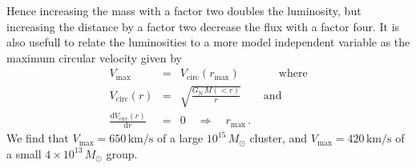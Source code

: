 \documentclass[10pt,aps,pra,reprint,amsmath,amsfonts,amssymb,showpacs]{revtex4-1}
\def\del#1{{}}
\newcommand{\rmn}{\mathrm}
\newcommand{\sub}{\rmn{sub}}
\newcommand{\msun}{M_\odot}
\newcommand{\dd}{\rmn{d}}
\begin{document}
Hence increasing the mass with a factor two doubles the luminosity,
but increasing the distance by a factor two decrease the flux with a
factor four. It is also usefull to relate the luminosities to a more
model independent variable as the maximum circular velocity given by
\begin{eqnarray}
V_\rmn{max} &=& V_\rmn{circ}(r_\rmn{max})\qquad\,\,\,\,\,\,\,\,\,\rmn{where}\nonumber\\
V_\rmn{circ}(r)&=& \sqrt{\frac{G_\rmn{N}\,M(<r)}{r}}\qquad\rmn{and}\nonumber\\
\frac{\dd V_\rmn{circ}(r)}{\dd r} &=& 0\quad \Longrightarrow\quad r_\rmn{max}\,.
\end{eqnarray}
We find that $V_\rmn{max}=650\,\rmn{km/s}$ of a large $10^{15}\,\msun$
cluster, and $V_\rmn{max}=420\,\rmn{km/s}$ of a small
$4\times10^{13}\,\msun$ group.


\del{
\begin{eqnarray}
L_{\gamma,\rmn{sub tot}} \propto N\,L_{\gamma,\sub} \propto N\,M_\sub 
 \propto M_\sub^{\left(A+1\right)}\,\frac{\dd N_\sub}{\dd M} \propto  M^{A-0.9}
\end{eqnarray}
Assuming that the concentration $c$ decrease for increasing mass as it
does for the mass range $10^{12}-10^{14}\,\msun$ where
$L_{\gamma,\sub} \propto N\,M_\sub^A$, where $A<1$.
}
\end{document}
